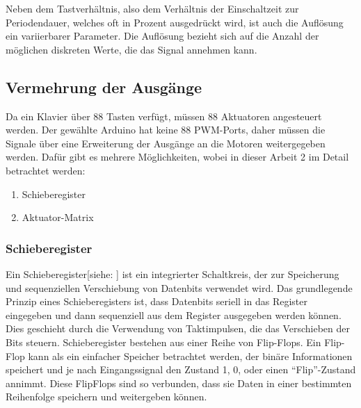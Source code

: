 Neben dem Tastverhältnis, also dem Verhältnis der Einschaltzeit zur Periodendauer, welches oft in Prozent ausgedrückt wird, ist auch die Auflösung ein variierbarer Parameter.
Die Auflösung bezieht sich auf die Anzahl der möglichen diskreten Werte, die das Signal annehmen kann.


\subsection{Vermehrung der Ausgänge}\label{output}
Da ein Klavier über 88 Tasten verfügt, müssen 88 Aktuatoren angesteuert werden. Der gewählte Arduino hat keine 88 \ac{PWM}-Ports, daher
müssen die Signale über eine Erweiterung der Ausgänge an die Motoren weitergegeben werden. Dafür gibt es mehrere Möglichkeiten,
wobei in dieser Arbeit 2 im Detail betrachtet werden:

\begin{enumerate}
	\item Schieberegister
	\item Aktuator-Matrix
\end{enumerate}


\subsubsection{Schieberegister}
Ein Schieberegister[siehe: \cite*[siehe ][]{Schieberegister}] ist ein integrierter Schaltkreis, der zur Speicherung und sequenziellen Verschiebung von
Datenbits verwendet wird.\newline
Das grundlegende Prinzip eines Schieberegisters ist, dass Datenbits seriell in das Register eingegeben und dann
sequenziell aus dem Register ausgegeben werden können.
Dies geschieht durch die Verwendung von Taktimpulsen, die das Verschieben der Bits steuern.\newline
Schieberegister bestehen aus einer Reihe von Flip-Flops.
Ein Flip-Flop kann als ein einfacher Speicher betrachtet werden, der binäre Informationen speichert und je nach
Eingangssignal den Zustand 1, 0, oder einen \enquote{Flip}-Zustand annimmt.
Diese FlipFlops sind so verbunden, dass sie Daten in einer bestimmten Reihenfolge speichern und weitergeben können.

